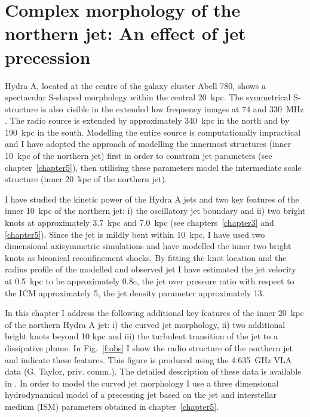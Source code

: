 \chapter{Complex morphology of the northern jet: An effect of jet precession}\label{chapter7}


Hydra A, located at the centre of the galaxy cluster Abell 780, shows a spectacular S-shaped morphology within the central 20~kpc. The symmetrical S-structure is also visible in the extended low frequency images at 74 and 330~MHz \citep{lane04}. The radio source is extended by approximately 340~kpc in the north and by 190~kpc in the south. Modelling the entire source is computationally impractical and I have adopted the approach of modelling the innermost structures (inner 10~kpc of the northern jet) first in order to constrain jet parameters (see chapter~\ref{chapter5}), then utilising these parameters model the intermediate scale structure (inner 20~kpc of the northern jet). 

I have studied the kinetic power of the Hydra A jets and two key features of the inner 10~kpc of the northern jet: i) the oscillatory jet boundary and ii) two bright knots at approximately 3.7~kpc and 7.0~kpc (see chapters~\ref{chapter3} and \ref{chapter5}). Since the jet is mildly bent within 10~kpc, I have used two dimensional axisymmetric simulations and have modelled the inner two bright knots as biconical reconfinement shocks. By fitting the knot location and the radius profile of the modelled and observed jet I have estimated the jet velocity at 0.5~kpc to be approximately 0.8c, the jet over pressure ratio  with respect to the ICM approximately 5, the jet density parameter approximately 13. 

In this chapter I address the following additional key features of the inner 20~kpc of the northern Hydra A jet: i) the curved jet morphology, ii) two additional bright knots beyond 10 kpc and iii) the turbulent transition of the jet to a dissipative plume. In Fig.~\ref{f:obs} I show the radio structure of the northern jet and indicate these features. This figure is produced using the 4.635~GHz VLA data (G. Taylor, priv. comm.).  The detailed description of these data is available in \citet{taylor90}. In order to model the curved jet morphology I use a three dimensional hydrodynamical model of a precessing jet based on the jet and interstellar medium (ISM) parameters obtained in chapter~\ref{chapter5}. 

%
%
